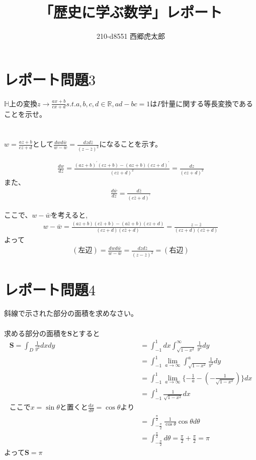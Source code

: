 \documentclass[12pt]{jarticle}
\title{「歴史に学ぶ数学」レポート}
\begin{document}
\date{}
\author{210-d8551 西郷虎太郎}
\maketitle
\section{レポート問題$3$}
$\mathbb{H}$上の変換$\displaystyle z \rightarrow \frac{ax+b}{cx+d}$$s.t. a, b, c, d\in \mathbb{R}, ad-bc=1$は$P$計量に関する等長変換であることを示せ。\\
\\
\\
$\displaystyle w=\frac{az+b}{cz+d}$として$\displaystyle \frac{dwd\bar{w}}{w - \bar{w}} = \frac{dzd\bar{z}}{(z - \bar{z})^2}$になることを示す。

\begin{align}
  \label{}
  \displaystyle
  \frac{dw}{dz} = \frac{(az+b)^{\prime}(cz+b)-(az+b)(cz+d)^{\prime}}{(cz+d)^2} = \frac{dz}{(cz+d)^2}
\end{align}
また、
\begin{align}
  \label{}
  \displaystyle
  \frac{d\bar{w}}{dz} = \frac{d\bar{z}}{(c\bar{z} + d)^{\prime}}
\end{align}

ここで、$w - \bar{w}$を考えると,
\begin{align}
  \label{}
  \displaystyle
  w - \bar{w} = \frac{(az+b)(c\bar{z}+b)-(a\bar{z}+b)(cz+d)}{(cz+d)(c\bar{z}+d)} = \frac{z - \bar{z}}{(cz+d)(c\bar{z}+d)}
\end{align}
よって
\begin{align}
  \label{}
  \displaystyle
  (左辺) = \frac{dwd\bar{w}}{w - \bar{w}}= \frac{dzd\bar{z}}{(z - \bar{z})^2} = (右辺)
\end{align}
\newpage
\section{レポート問題$4$}
斜線で示された部分の面積を求めなさい。
\\
\\
求める部分の面積を$\boldsymbol{S}$とすると
\begin{align*}
  \label{}
  \displaystyle
  \boldsymbol{S} = \int_D \frac{1}{y^2}dxdy &= \int_{-1}^1 dx \int_{\sqrt{1 - x^2}}^\infty \frac{1}{y^2} dy \\ &= \int_{-1}^1 \lim_{a \to \infty} \int_{\sqrt{1 - x^2}}^a \frac{1}{y^2} dy \\ &= \int_{-1}^1 \lim_{a \to \infty} \{-\frac{1}{a} - (-\frac{1}{\sqrt{1 - x^2}})\}dx  \\ &= \int_{-1}^1 \frac{1}{\sqrt{1 - x^2}}dx \\ ここで x = \sin{\theta} と置くと \frac{dx}{d\theta} = \cos{\theta}より\\
  &= \int_{-\frac{\pi}{2}}^{\frac{\pi}{2}} \frac{1}{\cos{\theta}}\cos{\theta} d\theta \\ &= \int_{-\frac{\pi}{2}}^{\frac{\pi}{2}} d\theta = \frac{\pi}{2} + \frac{\pi}{2} = \pi
\end{align*}
よって$\boldsymbol{S} = \pi$
\end{document}

